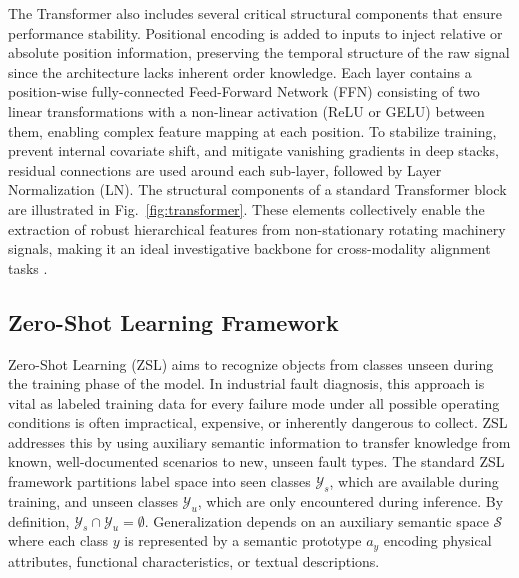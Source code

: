 The Transformer also includes several critical structural components that ensure performance stability. Positional encoding is added to inputs to inject relative or absolute position information, preserving the temporal structure of the raw signal since the architecture lacks inherent order knowledge. Each layer contains a position-wise fully-connected Feed-Forward Network (FFN) consisting of two linear transformations with a non-linear activation (ReLU or GELU) between them, enabling complex feature mapping at each position. To stabilize training, prevent internal covariate shift, and mitigate vanishing gradients in deep stacks, residual connections are used around each sub-layer, followed by Layer Normalization (LN). The structural components of a standard Transformer block are illustrated in Fig.~\ref{fig:transformer}. These elements collectively enable the extraction of robust hierarchical features from non-stationary rotating machinery signals, making it an ideal investigative backbone for cross-modality alignment tasks \cite{vaswani2017attention}.

\subsection{Zero-Shot Learning Framework}
Zero-Shot Learning (ZSL) aims to recognize objects from classes unseen during the training phase of the model. In industrial fault diagnosis, this approach is vital as labeled training data for every failure mode under all possible operating conditions is often impractical, expensive, or inherently dangerous to collect. ZSL addresses this by using auxiliary semantic information to transfer knowledge from known, well-documented scenarios to new, unseen fault types. The standard ZSL framework partitions label space into seen classes $\mathcal{Y}_s$, which are available during training, and unseen classes $\mathcal{Y}_u$, which are only encountered during inference. By definition, $\mathcal{Y}_s \cap \mathcal{Y}_u = \emptyset$. Generalization depends on an auxiliary semantic space $\mathcal{S}$ where each class $y$ is represented by a semantic prototype $a_y$ encoding physical attributes, functional characteristics, or textual descriptions.

